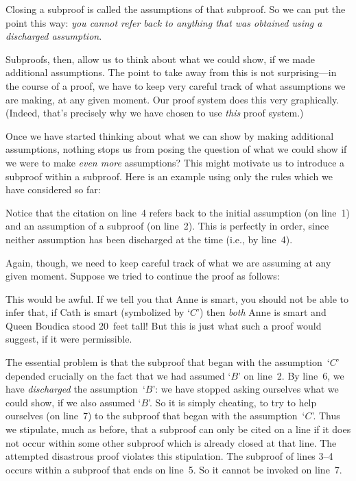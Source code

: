 Closing a subproof is called  the assumptions of
that subproof. So we can put the point this way: \emph{you cannot
refer back to anything that was obtained using a discharged
assumption}.

Subproofs, then, allow us to think about what we could show, if we made additional assumptions. The point to take away from this is not surprising---in the course of a proof, we have to keep very careful track of what assumptions we are making, at any given moment. Our proof system does this very graphically. (Indeed, that's precisely why we have chosen to use \emph{this} proof system.)

Once we have started thinking about what we can show by making additional assumptions, nothing stops us from posing the question of what we could show if we were to make \emph{even more} assumptions? This might motivate us to introduce a subproof within a subproof. Here is an example using only the rules which we have considered so far: 
\begin{fitchproof}
\PR
\open
	\AS
	\open
		\AS
	\close
\close
{}
\end{fitchproof}
Notice that the citation on line~4 refers back to the initial
assumption (on line~1) and an assumption of a subproof (on
line~2). This is perfectly in order, since neither assumption has
been discharged at the time (i.e., by line~4).

Again, though, we need to keep careful track of what we are assuming at any given moment. Suppose we tried to continue the proof as follows:
\begin{fitchproof}
\PR
\open
	\AS
	\open
		\AS
	\close
\close
{}
\ifHTMLtarget
\else
	 
\fi
\end{fitchproof}
This would be awful. If we tell you that Anne is smart, you should not
be able to infer that, if Cath is smart (symbolized by `$C$') then
\emph{both} Anne is smart and Queen Boudica stood 20~feet tall! But
this is just what such a proof would suggest, if it were permissible.

The essential problem is that the subproof that began with the assumption~`$C$' depended crucially on the fact that we had assumed `$B$' on line~2. By line~6, we have \emph{discharged} the assumption~`$B$': we have stopped asking ourselves what we could show, if we also assumed `$B$'. So it is simply cheating, to try to help ourselves (on line~7) to the subproof that began with the assumption~`$C$'. Thus we stipulate, much as before, that a subproof can only be cited on a line if it does not occur within some other subproof which is already closed at that line. The attempted disastrous proof violates this stipulation. The subproof of lines 3--4 occurs within a subproof that ends on line~5. So it cannot be invoked on line~7.

